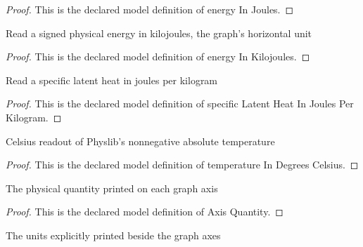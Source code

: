 \begin{proof}
  This is the declared model definition of energy In Joules.
\end{proof}
\begin{definition}
  \label{def:physics:phyx-mini-0405:phyxminiproblems-problemphyxmini0405-energyinkilojoules}
  Read a signed physical energy in kilojoules, the graph's horizontal unit
\end{definition}
\begin{proof}
  This is the declared model definition of energy In Kilojoules.
\end{proof}
\begin{definition}
  \label{def:physics:phyx-mini-0405:phyxminiproblems-problemphyxmini0405-specificlatentheatinjoulesperkilogram}
  Read a specific latent heat in joules per kilogram
\end{definition}
\begin{proof}
  This is the declared model definition of specific Latent Heat In Joules Per Kilogram.
\end{proof}
\begin{definition}
  \label{def:physics:phyx-mini-0405:phyxminiproblems-problemphyxmini0405-temperatureindegreescelsius}
  Celsius readout of Physlib's nonnegative absolute temperature
\end{definition}
\begin{proof}
  This is the declared model definition of temperature In Degrees Celsius.
\end{proof}
\begin{definition}
  \label{def:physics:phyx-mini-0405:phyxminiproblems-problemphyxmini0405-axisquantity}
  The physical quantity printed on each graph axis
\end{definition}
\begin{proof}
  This is the declared model definition of Axis Quantity.
\end{proof}
\begin{definition}
  \label{def:physics:phyx-mini-0405:phyxminiproblems-problemphyxmini0405-axisunit}
  The units explicitly printed beside the graph axes
\end{definition}
